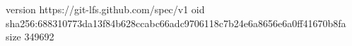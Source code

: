 version https://git-lfs.github.com/spec/v1
oid sha256:688310773da13f84b628ccabc66adc9706118c7b24e6a8656e6a0ff41670b8fa
size 349692
